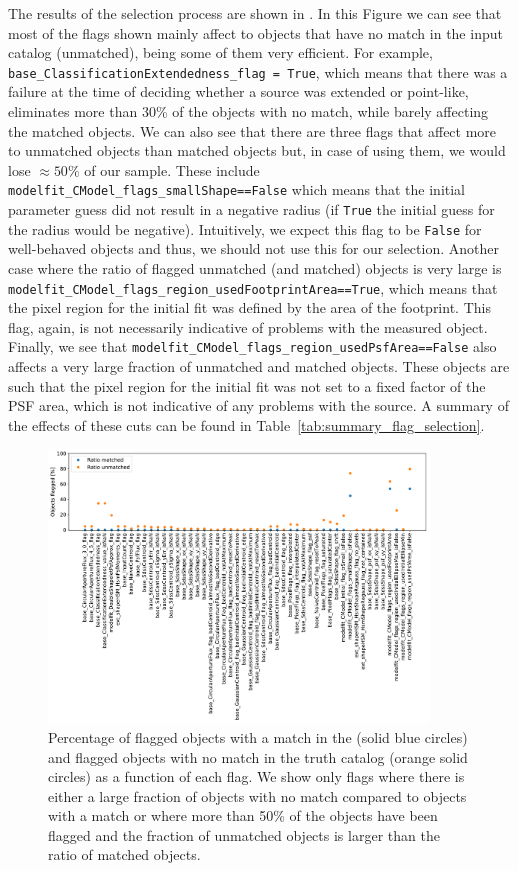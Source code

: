 \documentclass[twocolumn]{aastex62}
\begin{document}
The results of the selection process are shown in . In this Figure we can see that most of the flags shown mainly affect to objects that have no match in the input catalog (unmatched), being some of them very efficient. For example, \texttt{base\_ClassificationExtendedness\_flag = True}, which means that there was a failure at the time of deciding whether a source was extended or point-like, eliminates more than 30\% of the objects with no match, while barely affecting the matched objects. We can also see that there are three flags that affect more to unmatched objects than matched objects but, in case of using them, we would lose $\approx 50\%$ of our sample. These include \texttt{modelfit\_CModel\_flags\_smallShape==False} which means that the initial parameter guess did not result in a negative radius (if \texttt{True} the initial guess for the radius would be negative). Intuitively, we expect this flag to be \texttt{False} for well-behaved objects and thus, we should not use this for our selection. Another case where the ratio of flagged unmatched (and matched) objects is very large is \texttt{modelfit\_CModel\_flags\_region\_usedFootprintArea==True}, which means that the pixel region for the initial fit was defined by the area of the footprint. This flag, again, is not necessarily indicative of problems with the measured object. Finally, we see that \texttt{modelfit\_CModel\_flags\_region\_usedPsfArea==False} also affects a very large fraction of unmatched and matched objects. These objects are such that the pixel region for the initial fit was not set to a fixed factor of the PSF area, which is not indicative of any problems with the source. A summary of the effects of these cuts can be found in Table~\ref{tab:summary_flag_selection}.

\begin{figure}
\centering
\includegraphics[width=0.9\textwidth]{flags_DC1}
\caption{Percentage of flagged objects with a match in the (solid blue circles) and flagged objects with no match in the truth catalog (orange solid circles) as a function of each flag. We show only flags where there is either a large fraction of objects with no match compared to objects with a match or where more than 50\% of the objects have been flagged and the fraction of unmatched objects is larger than the ratio of matched objects.}
\label{fig:flags_DC1}
\end{figure}
\end{document}
